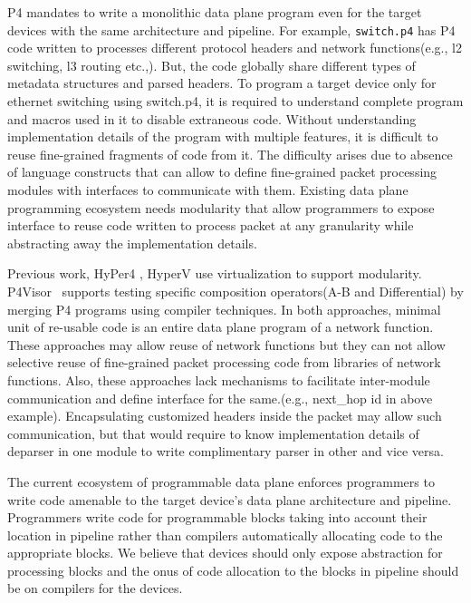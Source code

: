 P4 mandates to write a monolithic data plane program even for the target devices with the same architecture and pipeline.
For example, \texttt{switch.p4} \cite{switch.p4} has P4 code written to processes different protocol headers and network functions(e.g., l2 switching, l3 routing etc.,). 
But, the code globally share different types of metadata structures and parsed headers.
To program a target device only for ethernet switching using switch.p4, it is required to understand complete program and macros used in it to disable extraneous code.
Without understanding implementation details of the program with multiple features, it is difficult to reuse fine-grained fragments of code from it.
The difficulty arises due to absence of language constructs that can allow to define fine-grained packet processing modules with interfaces to communicate with them.
Existing data plane programming ecosystem needs modularity that allow programmers to expose interface to reuse code written to process packet at any granularity while abstracting away the implementation details.




Previous work, HyPer4 \cite{Hancock:2016:HUP:2999572.2999607}, HyperV \cite{8038396} use virtualization to support modularity.
P4Visor~\cite{Zheng:2018:PLV:3281411.3281436} supports testing specific composition operators(A-B and Differential) by merging P4 programs using compiler techniques.
In both approaches, minimal unit of re-usable code is an entire data plane program of a network function. 
These approaches may allow reuse of network functions but they can not allow selective reuse of fine-grained packet processing code from libraries of network functions.
Also, these approaches lack mechanisms to facilitate inter-module communication and define interface for the same.(e.g., next\_hop id in above example).
Encapsulating customized headers inside the packet may allow such communication, but that would require to know implementation details of deparser in one module to write complimentary parser in other and vice versa. 


The current ecosystem of programmable data plane enforces programmers to write code amenable to the target device's data plane architecture and pipeline.
Programmers write code for programmable blocks taking into account their location in pipeline rather than compilers automatically allocating code to the appropriate blocks.
We believe that devices should only expose abstraction for processing blocks and the onus of code allocation to the blocks in pipeline should be on compilers for the devices.

